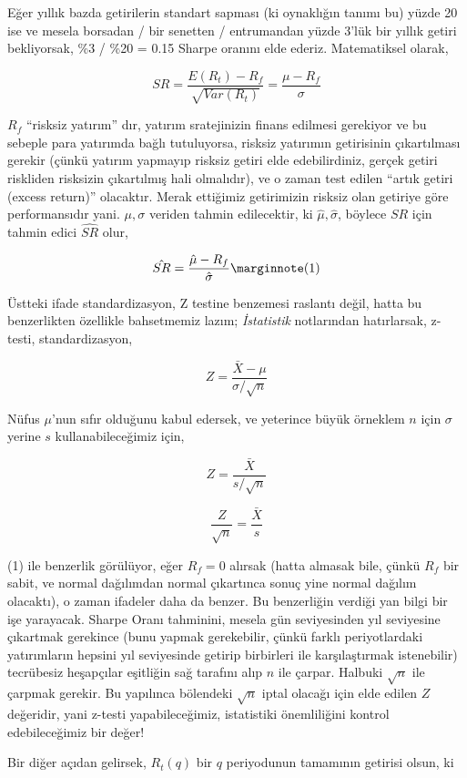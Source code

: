 \documentclass[12pt,fleqn]{article}\usepackage{../../common}
\begin{document}
Eğer yıllık bazda getirilerin standart sapması (ki oynaklığın tanımı bu) yüzde
20 ise ve mesela borsadan / bir senetten / entrumandan yüzde 3'lük bir yıllık
getiri bekliyorsak, \%3 / \%20 = 0.15 Sharpe oranını elde ederiz. Matematiksel
olarak,

$$ SR = \frac{E(R_t) - R_f}{\sqrt{Var(R_t)}} = \frac{\mu - R_f}{\sigma} $$

$R_f$ ``risksiz yatırım'' dır, yatırım sratejinizin finans edilmesi
gerekiyor ve bu sebeple para yatırımda bağlı tutuluyorsa, risksiz yatırımın
getirisinin çıkartılması gerekir (çünkü yatırım yapmayıp risksiz getiri
elde edebilirdiniz, gerçek getiri riskliden risksizin çıkartılmış hali
olmalıdır), ve o zaman test edilen ``artık getiri (excess return)''
olacaktır. Merak ettiğimiz getirimizin risksiz olan getiriye göre
performansıdır yani. $\mu,\sigma$ veriden tahmin edilecektir, ki
$\hat{\mu},\hat{\sigma}$, böylece $SR$ için tahmin edici $\hat{SR}$ olur,

$$ 
\hat{SR} = \frac{\hat{\mu} - R_f}{\hat{\sigma}} 
\mlabel{1} 
$$

Üstteki ifade standardizasyon, Z testine benzemesi raslantı değil, hatta bu
benzerlikten özellikle bahsetmemiz lazım; {\em İstatistik} notlarından
hatırlarsak, z-testi, standardizasyon,

$$ Z = \frac{\bar{X} - \mu}{\sigma / \sqrt{n} } $$

Nüfus $\mu$'nun sıfır olduğunu kabul edersek, ve yeterince büyük örneklem
$n$ için $\sigma$ yerine $s$ kullanabileceğimiz için,

$$ Z = \frac{\bar{X}}{s / \sqrt{n} } $$

$$ \frac{Z}{\sqrt{n}} = \frac{\bar{X}}{s} $$

(1) ile benzerlik görülüyor, eğer $R_f=0$ alırsak (hatta almasak bile,
çünkü $R_f$ bir sabit, ve normal dağılımdan normal çıkartınca sonuç yine
normal dağılım olacaktı), o zaman ifadeler daha da benzer. Bu benzerliğin
verdiği yan bilgi bir işe yarayacak. Sharpe Oranı tahminini, mesela gün
seviyesinden yıl seviyesine çıkartmak gerekince (bunu yapmak gerekebilir,
çünkü farklı periyotlardaki yatırımların hepsini yıl seviyesinde getirip
birbirleri ile karşılaştırmak istenebilir) tecrübesiz heşapçılar eşitliğin
sağ tarafını alıp $n$ ile çarpar. Halbuki $\sqrt{n}$ ile çarpmak
gerekir. Bu yapılınca bölendeki $\sqrt{n}$ iptal olacağı için elde edilen
$Z$ değeridir, yani z-testi yapabileceğimiz, istatistiki önemliliğini
kontrol edebileceğimiz bir değer!

Bir diğer açıdan gelirsek,  $R_t(q)$ bir $q$ periyodunun tamamının getirisi
olsun, ki
\end{document}
